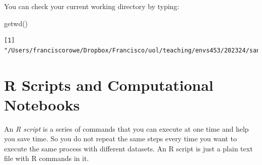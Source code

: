 \documentclass[
  letterpaper,
  DIV=11,
  numbers=noendperiod,
  oneside]{scrreprt}
\newenvironment{Shaded}{\begin{snugshade}}{\end{snugshade}}
\newcommand{\FunctionTok}[1]{\textcolor[rgb]{0.28,0.35,0.67}{#1}}
\newcommand{\NormalTok}[1]{\textcolor[rgb]{0.00,0.23,0.31}{#1}}
\begin{document}

You can check your current working directory by typing:

\begin{Shaded}
\begin{Highlighting}[]
\FunctionTok{getwd}\NormalTok{()}
\end{Highlighting}
\end{Shaded}

\begin{verbatim}
[1] "/Users/franciscorowe/Dropbox/Francisco/uol/teaching/envs453/202324/san"
\end{verbatim}

\section{R Scripts and Computational
Notebooks}\label{r-scripts-and-computational-notebooks}

An \emph{R script} is a series of commands that you can execute at one
time and help you save time. So you do not repeat the same steps every
time you want to execute the same process with different datasets. An R
script is just a plain text file with R commands in it.
\end{document}
